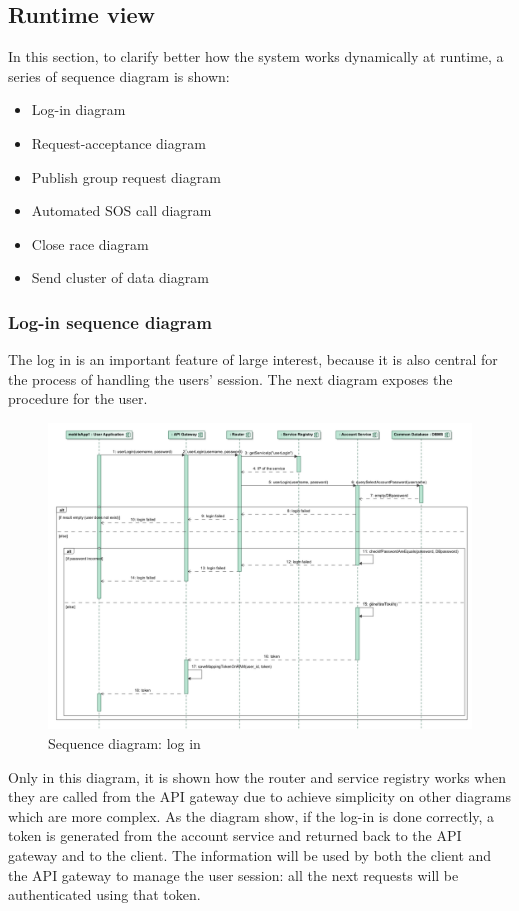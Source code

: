 \subsection{Runtime view}
In this section, to clarify better how the system works dynamically at runtime, a series of sequence diagram is shown:
\begin{itemize}
\item Log-in diagram
\item Request-acceptance diagram
\item Publish group request diagram
\item Automated SOS call diagram
\item Close race diagram
\item Send cluster of data diagram
\end{itemize}

\subsubsection{Log-in sequence diagram}
The log in is an important feature of large interest, because it is also central for the process of handling the users' session. The next
diagram exposes the procedure for the user.

\begin{figure}[H]
\includegraphics[width=\linewidth]{Images/login.pdf}
\caption{ Sequence diagram: log in}
\label{fig:login}
\end{figure}

Only in this diagram, it is shown how the router and service registry works when they are called from the API gateway due to achieve simplicity on other diagrams which are more complex. As the diagram show, if the log-in is done correctly, a token is generated from the account service and returned back to the API gateway
and to the client. 
The information will be used by both the client and the API gateway to manage the user session: all the next requests will be authenticated
using that token.  \\

